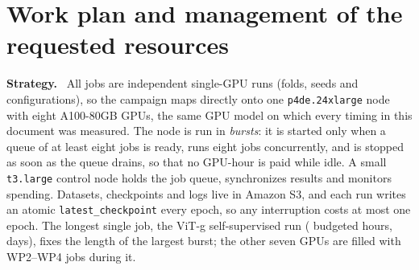 \documentclass[11pt,a4paper]{article}
\newcommand{\para}[1]{\textbf{#1}\ }
\begin{document}
\section{Work plan and management of the requested resources}

\para{Strategy.} All jobs are independent single-GPU runs (folds, seeds and configurations), so the campaign maps directly onto one \texttt{p4de.24xlarge} node with eight A100-80GB GPUs, the same GPU model on which every timing in this document was measured. The node is run in \emph{bursts}: it is started only when a queue of at least eight jobs is ready, runs eight jobs concurrently, and is stopped as soon as the queue drains, so that no GPU-hour is paid while idle. A small \texttt{t3.large} control node holds the job queue, synchronizes results and monitors spending. Datasets, checkpoints and logs live in Amazon S3, and each run writes an atomic \texttt{latest\_checkpoint} every epoch, so any interruption costs at most one epoch. The longest single job, the ViT-g self-supervised run (\LongestJobH{} budgeted hours, \LongestJobDays{} days), fixes the length of the largest burst; the other seven GPUs are filled with WP2--WP4 jobs during it.
\end{document}
